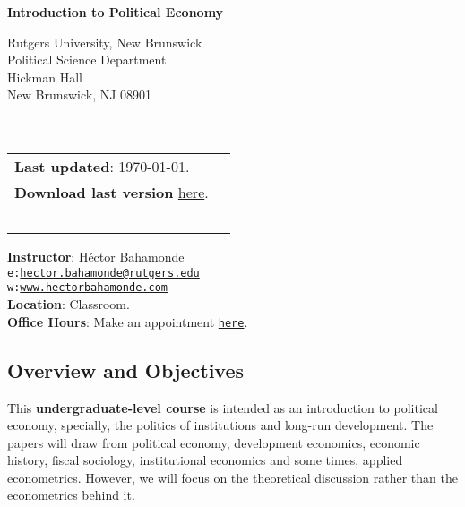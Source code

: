 \documentclass[letterpaper]{article}
\def\name{Introduction to Political Economy}
\begin{document}

\centerline{\huge \bf \name}

\vspace{0.25in}

\begin{minipage}{0.45\linewidth}
  Rutgers University, New Brunswick \\
  Political Science Department \\
  Hickman Hall \\
  New Brunswick, NJ 08901\\
  \\
  \\

\end{minipage}
\hspace{4cm}\begin{minipage}{0.45\linewidth}
  \begin{tabular}{ll}
{\bf Last updated}: \today. \\
 {\bf Download last version} \href{https://github.com/hbahamonde/Pol_Econ_Dev_UGrad/raw/master/Pol_Econ_Dev_Syllabus_UGRAD.pdf}{here}.
    \\
    \\
    \\
    \\
    \\
    \\
  \end{tabular}
\end{minipage}

\vspace{-5mm}
{\bf Instructor}: H\'ector Bahamonde\\
\texttt{e:}\href{mailto:hector.bahamonde@rutgers.edu}{\texttt{hector.bahamonde@rutgers.edu}}\\
\texttt{w:}\href{http://www.hectorbahamonde.com}{\texttt{www.hectorbahamonde.com}}\\
{\bf Location}: Classroom.\\
{\bf Office Hours}: Make an appointment \href{https://calendly.com/bahamonde/officehours}{\texttt{here}}.

\subsection*{Overview and Objectives}

This {\bf {\color{blue}undergraduate-level course}} is intended as an introduction to political economy, specially, the politics of institutions and long-run development. The papers will draw from political economy, development economics, economic history, fiscal sociology, institutional economics and some times, applied econometrics. However, we will focus on the theoretical discussion rather than the econometrics behind it.
\end{document}
